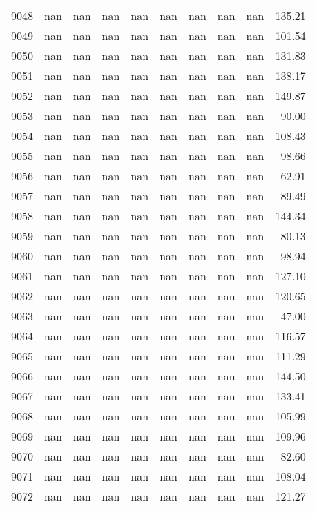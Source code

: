 \begin{tabular}{lrrrrrrrrr}
9048 & nan & nan & nan & nan & nan & nan & nan & nan & 135.21 \\
9049 & nan & nan & nan & nan & nan & nan & nan & nan & 101.54 \\
9050 & nan & nan & nan & nan & nan & nan & nan & nan & 131.83 \\
9051 & nan & nan & nan & nan & nan & nan & nan & nan & 138.17 \\
9052 & nan & nan & nan & nan & nan & nan & nan & nan & 149.87 \\
9053 & nan & nan & nan & nan & nan & nan & nan & nan & 90.00 \\
9054 & nan & nan & nan & nan & nan & nan & nan & nan & 108.43 \\
9055 & nan & nan & nan & nan & nan & nan & nan & nan & 98.66 \\
9056 & nan & nan & nan & nan & nan & nan & nan & nan & 62.91 \\
9057 & nan & nan & nan & nan & nan & nan & nan & nan & 89.49 \\
9058 & nan & nan & nan & nan & nan & nan & nan & nan & 144.34 \\
9059 & nan & nan & nan & nan & nan & nan & nan & nan & 80.13 \\
9060 & nan & nan & nan & nan & nan & nan & nan & nan & 98.94 \\
9061 & nan & nan & nan & nan & nan & nan & nan & nan & 127.10 \\
9062 & nan & nan & nan & nan & nan & nan & nan & nan & 120.65 \\
9063 & nan & nan & nan & nan & nan & nan & nan & nan & 47.00 \\
9064 & nan & nan & nan & nan & nan & nan & nan & nan & 116.57 \\
9065 & nan & nan & nan & nan & nan & nan & nan & nan & 111.29 \\
9066 & nan & nan & nan & nan & nan & nan & nan & nan & 144.50 \\
9067 & nan & nan & nan & nan & nan & nan & nan & nan & 133.41 \\
9068 & nan & nan & nan & nan & nan & nan & nan & nan & 105.99 \\
9069 & nan & nan & nan & nan & nan & nan & nan & nan & 109.96 \\
9070 & nan & nan & nan & nan & nan & nan & nan & nan & 82.60 \\
9071 & nan & nan & nan & nan & nan & nan & nan & nan & 108.04 \\
9072 & nan & nan & nan & nan & nan & nan & nan & nan & 121.27 \\

\end{tabular}
